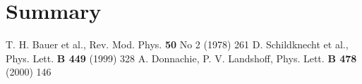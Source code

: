 \documentclass[epj,nopacs]{svjour}
\begin{document}


\section{ Summary}

\begin{thebibliography}{}
\baselineskip=0.38cm
 T. H. Bauer et al., Rev. Mod. Phys. \textbf{50} No 2 (1978) 261  
D. Schildknecht et al., Phys. Lett. \textbf{B 449} (1999) 328
A. Donnachie, P. V. Landshoff, Phys. Lett. \textbf{B 478} (2000) 146

\end{thebibliography}

% 
\end{document}

